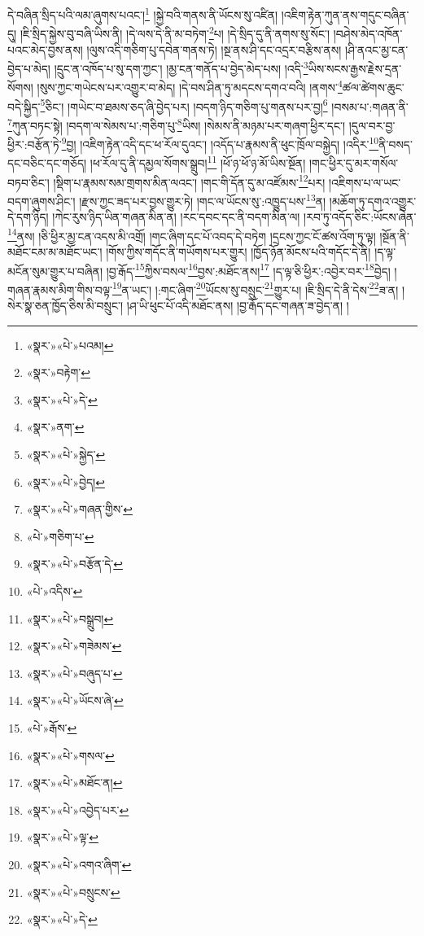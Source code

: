 དེ་བཞིན་སྲིད་པའི་ལམ་ཞུགས་པའང་།\footnote{«སྣར་»«པེ་»པའམ།} །སྐྱེ་བའི་གནས་ནི་ཡོངས་སུ་འཛིན། །འཇིག་རྟེན་ཀུན་ནས་གདུང་བཞིན་དུ། །ཇི་སྲིད་སྐྱེས་བུ་བཞི་ཡིས་ནི། །དེ་ལས་དེ་ནི་མ་བཏེག་\footnote{«སྣར་»བརྟེག་}པ། །དེ་སྲིད་དུ་ནི་ནགས་སུ་སོང་། །བཤེས་མེད་འཁོན་པའང་མེད་བྱས་ནས། །ལུས་འདི་གཅིག་པུ་དབེན་གནས་ཏེ། །སྔ་ནས་ཤི་དང་འདྲར་བརྩིས་ནས། །ཤི་ནའང་མྱ་ངན་བྱེད་པ་མེད། །དྲུང་ན་འཁོད་པ་སུ་དག་ཀྱང་། །མྱ་ངན་གནོད་པ་བྱེད་མེད་པས། །འདི་\footnote{«སྣར་»«པེ་»དེ་}ཡིས་སངས་རྒྱས་རྗེས་དྲན་སོགས། །སུས་ཀྱང་གཡེངས་པར་འགྱུར་བ་མེད། །དེ་བས་ཤིན་ཏུ་མདངས་དགའ་བའི། །ནགས་\footnote{«སྣར་»ནག་}ཚལ་ཚེགས་ཆུང་བདེ་སྐྱིད་\footnote{«སྣར་»«པེ་»སྐྱེད་}ཅིང་། །གཡེང་བ་ཐམས་ཅད་ཞི་བྱེད་པར། །བདག་ཉིད་གཅིག་པུ་གནས་པར་བྱ།\footnote{«སྣར་»«པེ་»བྱེད།} །བསམ་པ་:གཞན་ནི་\footnote{«སྣར་»«པེ་»གཞན་གྱིས་}ཀུན་བཏང་སྟེ། །བདག་ལ་སེམས་པ་:གཅིག་པུ་\footnote{«པེ་»གཅིག་པ་}ཡིས། །སེམས་ནི་མཉམ་པར་གཞག་ཕྱིར་དང་། །དུལ་བར་བྱ་ཕྱིར་:བརྩོན་ཏེ་\footnote{«སྣར་»«པེ་»བརྩོན་དེ་}བྱ། །འཇིག་རྟེན་འདི་དང་ཕ་རོལ་དུའང་། །འདོད་པ་རྣམས་ནི་ཕུང་ཁྲོལ་བསྐྱེད། །འདིར་\footnote{«པེ་»འདིས་}ནི་བསད་དང་བཅིང་དང་གཅོད། །ཕ་རོལ་དུ་ནི་དམྱལ་སོགས་སྒྲུབ།\footnote{«སྣར་»«པེ་»བསྒྲུབ།} །ཕོ་ཉ་ཕོ་ཉ་མོ་ཡིས་སྔོན། །གང་ཕྱིར་དུ་མར་གསོལ་བཏབ་ཅིང་། །སྡིག་པ་རྣམས་སམ་གྲགས་མིན་ལའང་། །གང་གི་དོན་དུ་མ་འཛོམས་\footnote{«སྣར་»«པེ་»གཟེམས་}པར། །འཇིགས་པ་ལ་ཡང་བདག་ཞུགས་ཤིང་། །རྫས་ཀྱང་ཟད་པར་བྱས་གྱུར་ཏེ། །གང་ལ་ཡོངས་སུ་:འཁྱུད་པས་\footnote{«སྣར་»«པེ་»བཞུད་པ་}ན། །མཆོག་ཏུ་དགའ་འགྱུར་དེ་དག་ཉིད། །ཀེང་རུས་ཉིད་ཡིན་གཞན་མིན་ན། །རང་དབང་དང་ནི་བདག་མིན་ལ། །རབ་ཏུ་འདོད་ཅིང་:ཡོངས་ཞེན་\footnote{«སྣར་»«པེ་»ཡོངས་ཞེ་}ནས། །ཅི་ཕྱིར་མྱ་ངན་འདས་མི་འགྲོ། །གང་ཞིག་དང་པོ་འབད་དེ་བཏེག །དྲངས་ཀྱང་ངོ་ཚས་འོག་ཏུ་ལྟ། །སྔོན་ནི་མཐོང་ངམ་མ་མཐོང་ཡང་། །གོས་ཀྱིས་གདོང་ནི་གཡོགས་པར་གྱུར། །ཁྱོད་ཉོན་མོངས་པའི་གདོང་དེ་ནི། །ད་ལྟ་མངོན་སུམ་གྱུར་པ་བཞིན། །བྱ་རྒོད་\footnote{«པེ་»རྒོས་}ཀྱིས་བསལ་\footnote{«སྣར་»«པེ་»གསལ་}བྱས་:མཐོང་ནས།\footnote{«སྣར་»«པེ་»མཐོང་ན།} །ད་ལྟ་ཅི་ཕྱིར་:འབྱེར་བར་\footnote{«སྣར་»«པེ་»འབྱེད་པར་}བྱེད། །གཞན་རྣམས་མིག་གིས་བལྟ་\footnote{«སྣར་»«པེ་»ལྟ་}ན་ཡང་། །:གང་ཞིག་\footnote{«སྣར་»«པེ་»འགའ་ཞིག་}ཡོངས་སུ་བསྲུང་\footnote{«སྣར་»«པེ་»བསྲུངས་}གྱུར་པ། །ཇི་སྲིད་དེ་ནི་དེས་\footnote{«སྣར་»«པེ་»དེ་}ཟ་ན། །སེར་སྣ་ཅན་ཁྱོད་ཅིས་མི་བསྲུང་། །ཤ་ཡི་ཕུང་པོ་འདི་མཐོང་ནས། །བྱ་རྒོད་དང་གཞན་ཟ་བྱེད་ན། །
